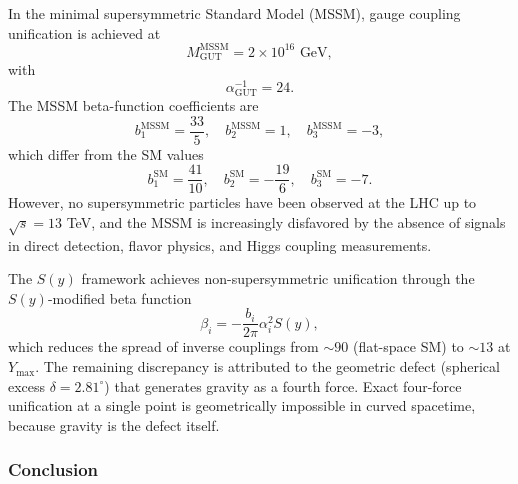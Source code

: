 \documentclass[12pt,oneside,openany]{book}
\begin{document}
In the minimal supersymmetric Standard Model (MSSM), gauge coupling unification is achieved at
\begin{equation}
M_{\mathrm{GUT}}^{\mathrm{MSSM}} = 2 \times 10^{16} \text{ GeV},
\label{eq:MGUT-MSSM}
\end{equation}
with
\begin{equation}
\alpha_{\mathrm{GUT}}^{-1} = 24.
\label{eq:alphaGUT-MSSM}
\end{equation}
The MSSM beta-function coefficients are
\begin{equation}
b_1^{\mathrm{MSSM}} = \frac{33}{5}, \quad b_2^{\mathrm{MSSM}} = 1, \quad b_3^{\mathrm{MSSM}} = -3,
\label{eq:b-MSSM}
\end{equation}
which differ from the SM values
\begin{equation}
b_1^{\mathrm{SM}} = \frac{41}{10}, \quad b_2^{\mathrm{SM}} = -\frac{19}{6}, \quad b_3^{\mathrm{SM}} = -7.
\label{eq:b-SM}
\end{equation}
However, no supersymmetric particles have been observed at the LHC up to $\sqrt{s} = 13$ TeV, and the MSSM is increasingly disfavored by the absence of signals in direct detection, flavor physics, and Higgs coupling measurements.

The $S(y)$ framework achieves non-supersymmetric unification through the $S(y)$-modified beta function
\begin{equation}
\beta_i = -\frac{b_i}{2\pi}\alpha_i^2 S(y),
\label{eq:beta-S}
\end{equation}
which reduces the spread of inverse couplings from $\sim 90$ (flat-space SM) to $\sim 13$ at $Y_{\max}$. The remaining discrepancy is attributed to the geometric defect (spherical excess $\delta = 2.81^\circ$) that generates gravity as a fourth force. Exact four-force unification at a single point is geometrically impossible in curved spacetime, because gravity is the defect itself.

\subsubsection{Conclusion}
\end{document}
